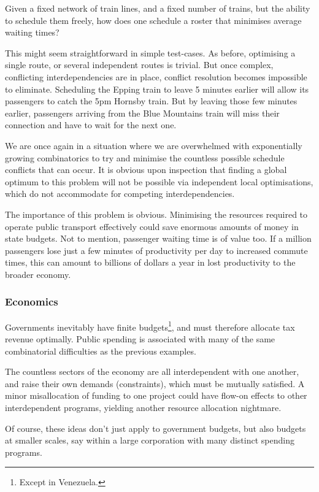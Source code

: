 Given a fixed network of train lines, and a fixed number of trains, but the ability to schedule them freely, how does one schedule a roster that minimises average waiting times?

This might seem straightforward in simple test-cases. As before, optimising a single route, or several independent routes is trivial. But once complex, conflicting interdependencies are in place, conflict resolution becomes impossible to eliminate. Scheduling the Epping train to leave 5 minutes earlier will allow its passengers to catch the 5pm Hornsby train. But by leaving those few minutes earlier, passengers arriving from the Blue Mountains train will miss their connection and have to wait for the next one.

We are once again in a situation where we are overwhelmed with exponentially growing combinatorics to try and minimise the countless possible schedule conflicts that can occur. It is obvious upon inspection that finding a global optimum to this problem will not be possible via independent local optimisations, which do not accommodate for competing interdependencies. 

The importance of this problem is obvious. Minimising the resources required to operate public transport effectively could save enormous amounts of money in state budgets. Not to mention, passenger waiting time is of value too. If a million passengers lose just a few minutes of productivity per day to increased commute times, this can amount to billions of dollars a year in lost productivity to the broader economy.

\subsubsection{Economics}

Governments inevitably have finite budgets\footnote{Except in Venezuela.}, and must therefore allocate tax revenue optimally. Public spending is associated with many of the same combinatorial difficulties as the previous examples.

The countless sectors of the economy are all interdependent with one another, and raise their own demands (constraints), which must be mutually satisfied. A minor misallocation of funding to one project could have flow-on effects to other interdependent programs, yielding another resource allocation nightmare.

Of course, these ideas don't just apply to government budgets, but also budgets at smaller scales, say within a large corporation with many distinct spending programs.

